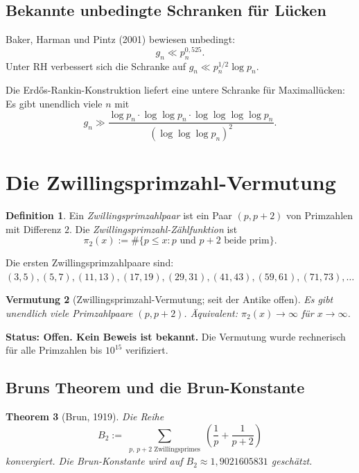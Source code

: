 \documentclass[12pt,a4paper]{amsart}
\newtheorem{theorem}{Theorem}[section]
\newtheorem{vermutung}[theorem]{Vermutung}
\theoremstyle{definition}
\newtheorem{definition}[theorem]{Definition}
\begin{document}
\subsection{Bekannte unbedingte Schranken f\"{u}r L\"{u}cken}

Baker, Harman und Pintz (2001) bewiesen unbedingt:
\[
  g_n \ll p_n^{0{,}525}.
\]
Unter RH verbessert sich die Schranke auf $g_n \ll p_n^{1/2} \log p_n$.

Die Erd\H{o}s-Rankin-Konstruktion liefert eine untere Schranke f\"{u}r
Maximall\"{u}cken: Es gibt unendlich viele $n$ mit
\[
  g_n \gg \frac{\log p_n \cdot \log\log p_n \cdot \log\log\log\log p_n}{(\log\log\log p_n)^2}.
\]

\section{Die Zwillingsprimzahl-Vermutung}

\begin{definition}
Ein \emph{Zwillingsprimzahlpaar} ist ein Paar $(p, p+2)$ von Primzahlen mit
Differenz $2$. Die \emph{Zwillingsprimzahl-Z\"{a}hlfunktion} ist
\[
  \pi_2(x) := \#\{p \leq x : p \text{ und } p+2 \text{ beide prim}\}.
\]
\end{definition}

Die ersten Zwillingsprimzahlpaare sind: $(3,5), (5,7), (11,13), (17,19),
(29,31), (41,43), (59,61), (71,73), \ldots$

\begin{vermutung}[Zwillingsprimzahl-Vermutung; seit der Antike offen]
Es gibt unendlich viele Primzahlpaare $(p, p+2)$. \"{A}quivalent:
$\pi_2(x) \to \infty$ f\"{u}r $x \to \infty$.
\end{vermutung}

\textbf{Status: Offen. Kein Beweis ist bekannt.} Die Vermutung wurde
rechnerisch f\"{u}r alle Primzahlen bis $10^{15}$ verifiziert.

\subsection{Bruns Theorem und die Brun-Konstante}

\begin{theorem}[Brun, 1919]
Die Reihe
\[
  B_2 := \sum_{\substack{p,\, p+2 \text{ Zwillingsprimes}}} \left(\frac{1}{p} + \frac{1}{p+2}\right)
\]
konvergiert. Die \emph{Brun-Konstante} wird auf $B_2 \approx 1{,}9021605831$
gesch\"{a}tzt.
\end{theorem}
\end{document}
